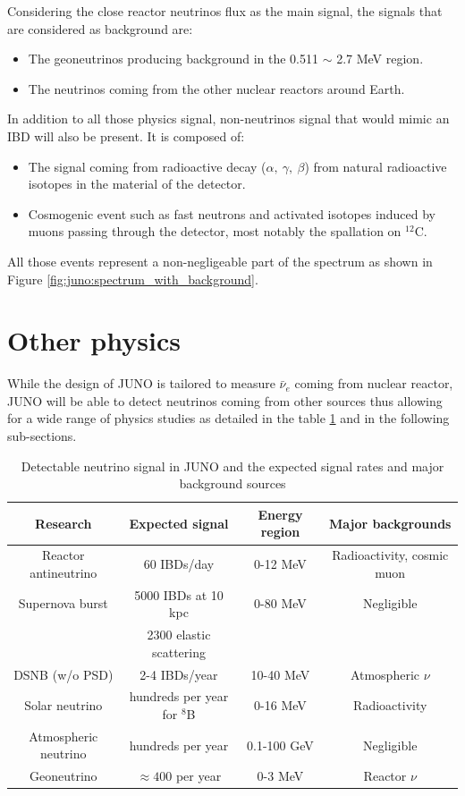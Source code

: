 \documentclass[../main.tex]{subfiles}
\begin{document}
Considering the close reactor neutrinos flux as the main signal, the signals that are considered as background are:
\begin{itemize}
  \item The geoneutrinos producing background in the 0.511 $\sim$ 2.7 MeV region.
  \item The neutrinos coming from the other nuclear reactors around Earth.
\end{itemize}
In addition to all those physics signal, non-neutrinos signal that would mimic an IBD will also be present. It is composed of:
\begin{itemize}
  \item The signal coming from radioactive decay ($\alpha, ~ \gamma, ~ \beta$) from natural radioactive isotopes in the material of the detector.
  \item Cosmogenic event such as fast neutrons and activated isotopes induced by muons passing through the detector, most notably the spallation on $^{12}$C.
\end{itemize}
All those events represent a non-negligeable part of the spectrum as shown in Figure \ref{fig:juno:spectrum_with_background}.


\section{Other physics}

While the design of JUNO is tailored to measure $\bar{\nu}_e$ coming from nuclear reactor, JUNO will be able to detect neutrinos coming from other sources thus allowing for a wide range of physics studies as detailed in the table \ref{tab:juno:signal} and in the following sub-sections.

\begin{table}[ht]
\begin{center}
  \begin{tabular}{|c|c|c|c|}
    \hline Research & Expected signal & Energy region & Major backgrounds \\
    \hline Reactor antineutrino & 60 IBDs/day & 0-12 MeV  & Radioactivity, cosmic muon \\
    Supernova burst & 5000 IBDs at 10 kpc & 0-80 MeV & Negligible \\
                    & 2300 elastic scattering  & &  \\
    DSNB (w/o PSD) & 2-4 IBDs/year & 10-40 MeV & Atmospheric $\nu$ \\
    Solar neutrino & hundreds per year for $^8$B & 0-16 MeV & Radioactivity \\
    Atmospheric neutrino & hundreds per year & 0.1-100 GeV  & Negligible \\
    Geoneutrino &  $\approx 400$ per year & 0-3 MeV & Reactor $\nu$ \\
    \hline
  \end{tabular}
  \caption{Detectable neutrino signal in JUNO and the expected signal rates and major background sources}
  \label{tab:juno:signal}
\end{center}
\end{table}
\end{document}

